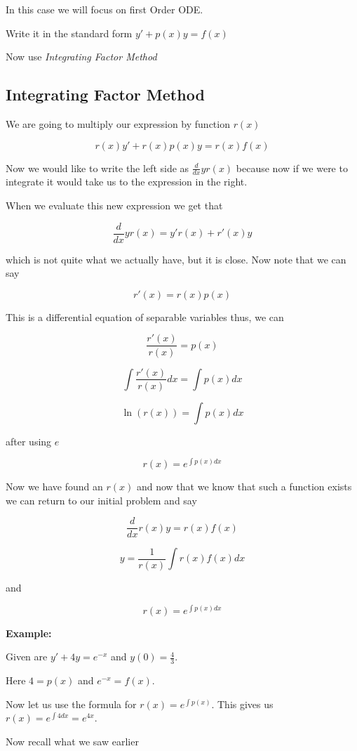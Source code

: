 In this case we will focus on first Order ODE.

Write it in the standard form \(y' + p(x)y = f(x)\)

Now use \emph{Integrating Factor Method}

\subsection{Integrating Factor Method}

We are going to multiply our expression by function \(r(x)\) 

\[
    r(x)y' + r(x)p(x)y = r(x)f(x)
\]

Now we would like to write the left side as \(\frac{d}{dx} y r(x)\) because now if we
were to integrate it would take us to the expression in the right.

When we evaluate this new expression we get that

\[
    \frac{d}{dx} y r(x) = y'r(x) + r'(x)y
\]

which is not quite what we actually have, but it is close. Now note that we can say

\[
    r'(x) = r(x)p(x)
\]

This is a differential equation of separable variables thus, we can

\[
    \frac{r'(x)}{r(x)} = p(x)
\]

\[
    \int \frac{r'(x)}{r(x)}dx = \int p(x)dx
\]

\[
    \ln(r(x)) = \int p(x) dx
\]

after using \(e\)

\[ 
    r(x) = e^{\int p(x) dx}
\]

Now we have found an \(r(x)\) and now that we know that such a function exists we can return 
to our initial problem and say

\[
    \frac{d}{dx}r(x)y = r(x)f(x)
\]

\[
    y = \frac{1}{r (x) } \int r (x) f (x) dx
\]

and 

\[
    r(x) = e^{\int p (x) dx}
\]

\textbf{Example:}

Given are \(y' + 4y = e^{-x}\) and \(y(0) = \frac{4}{3}\).

Here \(4 = p(x)\) and \(e^{-x} = f(x)\).

Now let us use the formula for \(r(x) = e^{\int p (x)}\). This gives us 
\(r(x) = e^{\int 4dx} = e^{4x}\).

Now recall what we saw earlier

